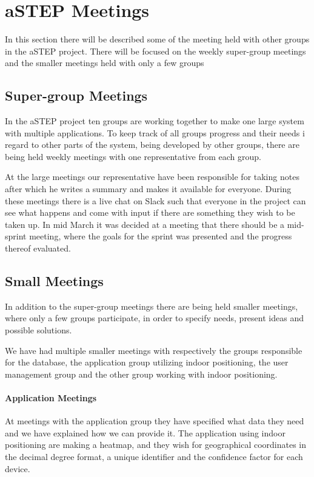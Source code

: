 \section{aSTEP Meetings}
In this section there will be described some of the meeting held with other groups in the aSTEP project. There will be focused on the weekly super-group meetings and the smaller meetings held with only a few groups

\subsection{Super-group Meetings}\label{subsec:supergroup_meetings}
In the aSTEP project ten groups are working together to make one large system with multiple applications. To keep track of all groups progress and their needs i regard to other parts of the system, being developed by other groups, there are being held weekly meetings with one representative from each group.

At the large meetings our representative have been responsible for taking notes after which he writes a summary and makes it available for everyone. During these meetings there is a live chat on Slack \cite{slack}such that everyone in the project can see what happens and come with input if there are something they wish to be taken up. In mid March it was decided at a meeting that there should be a mid-sprint meeting, where the goals for the sprint was presented and the progress thereof evaluated.

\subsection{Small Meetings}\label{subsec:small_meetings}
In addition to the super-group meetings there are being held smaller meetings, where only a few groups participate, in order to specify needs, present ideas and possible solutions.

We have had multiple smaller meetings with respectively the groups responsible for the database, the application group utilizing indoor positioning, the user management group and the other group working with indoor positioning.
 
\paragraph{Application Meetings}
At meetings with the application group they have specified what data they need and we have explained how we can provide it. The application using indoor positioning are making a heatmap, and they wish for geographical coordinates in the decimal degree format, a unique identifier and the confidence factor for each device.

